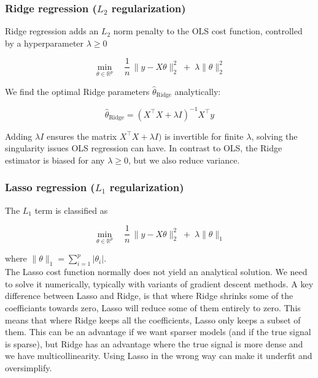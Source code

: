 \documentclass[amssymb,twocolumn,aps]{revtex4}
\begin{document}
\subsubsection{Ridge regression ($L_2$ regularization)} 

Ridge regression adds an $L_2$ norm penalty to the OLS cost function, controlled by a hyperparameter $\lambda \ge 0$

\begin{equation}
\min_{\theta \in \mathbb{R}^p}
\quad
\frac{1}{n}\,\lVert y - X\theta \rVert_2^2
\;+\;
\lambda \lVert \theta \rVert_2^2
\end{equation}

We find the optimal Ridge parameters $\hat{\theta}_{\text{Ridge}}$ analytically: 

\begin{equation}
    \hat{\theta}_{\text{Ridge}}
= (X^\top X + \lambda I)^{-1} X^\top y
\end{equation}

Adding $\lambda I$ ensures the matrix $X^\top X + \lambda I)$ is invertible for finite $\lambda$, solving the singularity issues OLS regression can have. In contrast to OLS, the Ridge estimator is biased for any $\lambda \ge 0$, but we also reduce variance. \\

\subsubsection{Lasso regression ($L_1$ regularization)}

The $L_1$ term is classified as 

\begin{equation}
\min_{\theta \in \mathbb{R}^p}
\quad
\frac{1}{n}\,\lVert y - X\theta \rVert_2^2
\;+\;
\lambda \lVert \theta \rVert_1
\end{equation}

where $\lVert \theta \rVert_1 = \sum_{i=1}^p \lvert \theta_i \rvert$. \\

The Lasso cost function normally does not yield an analytical solution. We need to solve it numerically, typically with variants of gradient descent methods. A key difference between Lasso and Ridge, is that where Ridge shrinks some of the coefficiants towards zero, Lasso will reduce some of them entirely to zero. This means that where Ridge keeps all the coefficients, Lasso only keeps a subset of them. This can be an advantage if we want sparser models (and if the true signal is sparse), but Ridge has an advantage where the true signal is more dense and we have multicollinearity. Using Lasso in the wrong way can make it underfit and oversimplify. 
\end{document}
